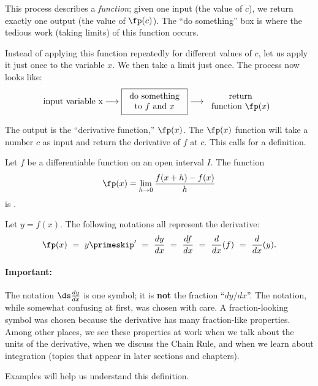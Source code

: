 This process describes a \textit{function}; given one input (the value of $c$), we return exactly one output (the value of $\fp(c)$). The ``do something'' box is where the tedious work (taking limits) of this function occurs. 

Instead of applying this function repeatedly for different values of $c$, let us apply it just once to the variable $x$. We then take a limit just once. The process now looks like:
\[
\text{input variable x}
\longrightarrow
\fbox{\begin{tabular}{c}do something\\to $f$ and $x$\end{tabular}}
\longrightarrow
\begin{tabular}{c}return\\function $\fp(x)$\end{tabular}
\]

The output is the ``derivative function,'' $\fp(x)$. The $\fp(x)$ function will take a number $c$ as input and return the derivative of $f$ at $c$. This calls for a definition.

\begin{definition}\label{def:the_derivative}
Let $f$ be a differentiable function on an open interval $I$. The function
\[\fp(x) = \lim_{h\to 0} \frac{f(x+h)-f(x)}{h}\]
is .\\


Let $y = f(x)$. The following notations all represent the derivative:
\[\fp(x)\ =\ y\primeskip'\ =\ \frac{dy}{dx}\ =\ \frac{df}{dx}\ =\ \frac{d}{dx}(f)\ =\ \frac{d}{dx}(y).\]
\end{definition}

\paragraph{Important:} The notation $\ds \frac{dy}{dx}$ is one symbol; it is \textbf{not} the fraction ``$dy/dx$''. The notation, while somewhat confusing at first, was chosen with care. A fraction-looking symbol was chosen because the derivative has many fraction-like properties. Among other places, we see these properties at work when we talk about the units of the derivative, when we discuss the Chain Rule, and when we learn about integration (topics that appear in later sections and chapters).\bigskip

Examples will help us understand this definition.


